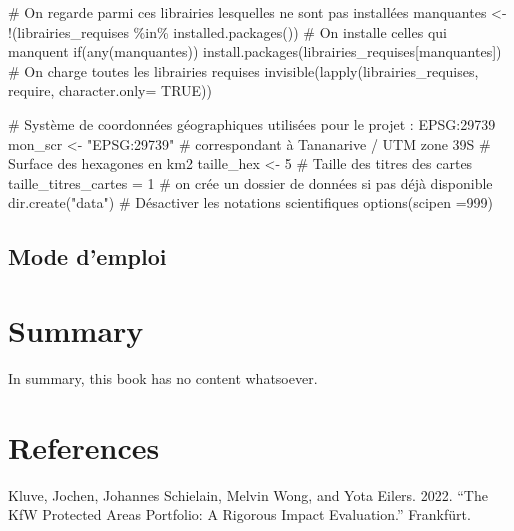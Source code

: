 \documentclass[
  letterpaper,
  DIV=11,
  numbers=noendperiod]{scrreprt}
\newenvironment{Shaded}{\begin{snugshade}}{\end{snugshade}}
\newcommand{\AttributeTok}[1]{\textcolor[rgb]{0.40,0.45,0.13}{#1}}
\newcommand{\CommentTok}[1]{\textcolor[rgb]{0.37,0.37,0.37}{#1}}
\newcommand{\ConstantTok}[1]{\textcolor[rgb]{0.56,0.35,0.01}{#1}}
\newcommand{\ControlFlowTok}[1]{\textcolor[rgb]{0.00,0.23,0.31}{#1}}
\newcommand{\DecValTok}[1]{\textcolor[rgb]{0.68,0.00,0.00}{#1}}
\newcommand{\FunctionTok}[1]{\textcolor[rgb]{0.28,0.35,0.67}{#1}}
\newcommand{\NormalTok}[1]{\textcolor[rgb]{0.00,0.23,0.31}{#1}}
\newcommand{\OtherTok}[1]{\textcolor[rgb]{0.00,0.23,0.31}{#1}}
\newcommand{\SpecialCharTok}[1]{\textcolor[rgb]{0.37,0.37,0.37}{#1}}
\newcommand{\StringTok}[1]{\textcolor[rgb]{0.13,0.47,0.30}{#1}}
\newlength{\cslhangindent}
\newlength{\cslentryspacingunit} %
\newenvironment{CSLReferences}[2] %
 {%
  \setlength{\parindent}{0pt}
  \ifodd #1
  \let\oldpar\par
  \def\par{\hangindent=\cslhangindent\oldpar}
  \fi
  \setlength{\parskip}{#2\cslentryspacingunit}
 }%
 {}
\begin{document}
\begin{Shaded}
\begin{Highlighting}[]
\CommentTok{\# On regarde parmi ces librairies lesquelles ne sont pas installées}
\NormalTok{manquantes }\OtherTok{\textless{}{-}} \SpecialCharTok{!}\NormalTok{(librairies\_requises }\SpecialCharTok{\%in\%} \FunctionTok{installed.packages}\NormalTok{())}
\CommentTok{\# On installe celles qui manquent}
\ControlFlowTok{if}\NormalTok{(}\FunctionTok{any}\NormalTok{(manquantes)) }\FunctionTok{install.packages}\NormalTok{(librairies\_requises[manquantes])}
\CommentTok{\# On charge toutes les librairies requises}
\FunctionTok{invisible}\NormalTok{(}\FunctionTok{lapply}\NormalTok{(librairies\_requises, require, }\AttributeTok{character.only=} \ConstantTok{TRUE}\NormalTok{))}

\CommentTok{\# Système de coordonnées géographiques utilisées pour le projet : EPSG:29739}
\NormalTok{mon\_scr }\OtherTok{\textless{}{-}} \StringTok{"EPSG:29739"} \CommentTok{\# correspondant à Tananarive / UTM zone 39S}
\CommentTok{\# Surface des hexagones en km2}
\NormalTok{taille\_hex }\OtherTok{\textless{}{-}} \DecValTok{5}
\CommentTok{\# Taille des titres des cartes}
\NormalTok{taille\_titres\_cartes }\OtherTok{=} \DecValTok{1}
\CommentTok{\# on crée un dossier de données si pas déjà disponible}
\FunctionTok{dir.create}\NormalTok{(}\StringTok{"data"}\NormalTok{)}
\CommentTok{\# Désactiver les notations scientifiques}
\FunctionTok{options}\NormalTok{(}\AttributeTok{scipen =}\DecValTok{999}\NormalTok{)}
\end{Highlighting}
\end{Shaded}

\hypertarget{mode-demploi}{%
\section{Mode d'emploi}\label{mode-demploi}}


\hypertarget{summary}{%
\chapter{Summary}\label{summary}}

In summary, this book has no content whatsoever.


\hypertarget{references}{%
\chapter*{References}\label{references}}


\hypertarget{refs}{}
\begin{CSLReferences}{1}{0}
\leavevmode{}%
Kluve, Jochen, Johannes Schielain, Melvin Wong, and Yota Eilers. 2022.
{``The {KfW} {Protected} {Areas} {Portfolio}: A {Rigorous} {Impact}
{Evaluation}.''} Frankfürt.

\end{CSLReferences}
\end{document}
